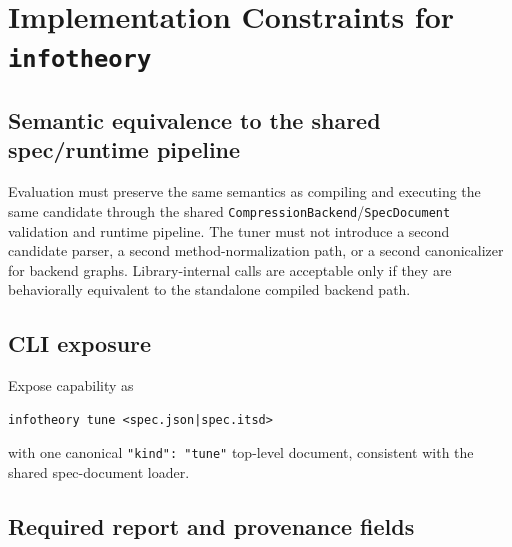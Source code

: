 \documentclass[11pt]{article}
\begin{document}
\section{Implementation Constraints for \texttt{infotheory}}

\subsection{Semantic equivalence to the shared spec/runtime pipeline}

Evaluation must preserve the same semantics as compiling and executing the same
candidate through the shared \texttt{CompressionBackend}/\texttt{SpecDocument}
validation and runtime pipeline. The tuner must not introduce a second
candidate parser, a second method-normalization path, or a second canonicalizer
for backend graphs. Library-internal calls are acceptable only if they are
behaviorally equivalent to the standalone compiled backend path.

\subsection{CLI exposure}

Expose capability as
\begin{verbatim}
infotheory tune <spec.json|spec.itsd>
\end{verbatim}
with one canonical \texttt{"kind": "tune"} top-level document, consistent
with the shared spec-document loader.

\subsection{Required report and provenance fields}
\end{document}
